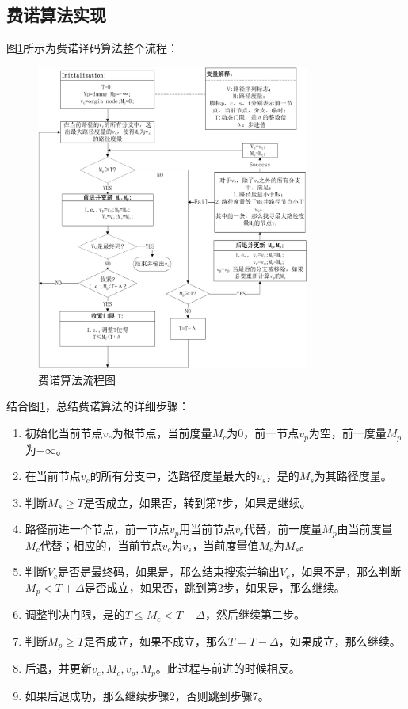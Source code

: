 \subsection{费诺算法实现}
图\ref{fig:3.5}所示为费诺译码算法整个流程：
\begin{figure}[htb] 
  \begin{center}
    \includegraphics[width=0.8\textwidth]{images/conv5.pdf}
  \end{center}
    \caption{费诺算法流程图}
  \label{fig:3.5}
\end{figure}
结合图\ref{fig:3.5}，总结费诺算法的详细步骤：
\begin{enumerate}
  \item
    初始化当前节点$v_c$为根节点，当前度量$M_c$为0，前一节点$v_p$为空，前一度量$M_p$为$-\infty$。
  \item
    在当前节点$v_c$的所有分支中，选路径度量最大的$v_s$，是的$M_s$为其路径度量。
  \item 判断$M_s\ge T$是否成立，如果否，转到第7步，如果是继续。
  \item
    路径前进一个节点，前一节点$v_p$用当前节点$v_c$代替，前一度量$M_p$由当前度量$M_c$代替；相应的，当前节点$v_c$为$v_s$，当前度量值$M_c$为$M_s$。
  \item
    判断$V_c$是否是最终码，如果是，那么结束搜索并输出$V_c$，如果不是，那么判断$M_p<T+\Delta$是否成立，如果否，跳到第2步，如果是，那么继续。
  \item 调整判决门限，是的$T\le M_c<T+\Delta$，然后继续第二步。
  \item 判断$M_p\ge
    T$是否成立，如果不成立，那么$T=T-\Delta$，如果成立，那么继续。
  \item 后退，并更新$v_c,M_c,v_p,M_p$。此过程与前进的时候相反。
  \item 如果后退成功，那么继续步骤2，否则跳到步骤7。 
\end{enumerate}
